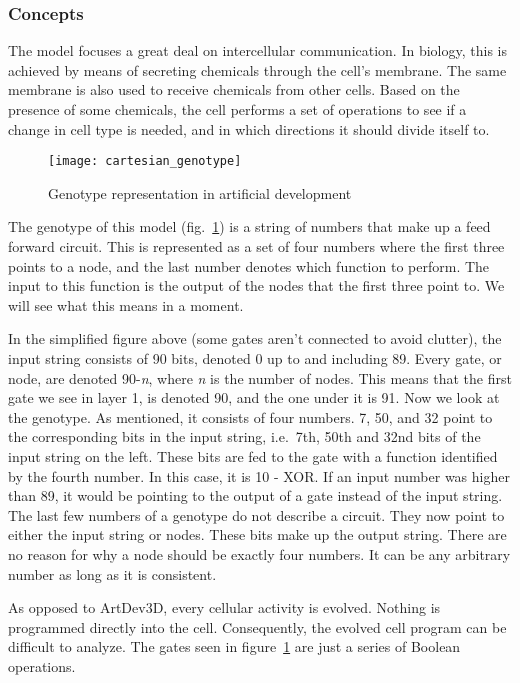 \subsubsection{Concepts}
The model focuses a great deal on intercellular communication. In biology, this is achieved by means of secreting chemicals through the cell's membrane. The same membrane is also used to receive chemicals from other cells. Based on the presence of some chemicals, the cell performs a set of operations to see if a change in cell type is needed, and in which directions it should divide itself to.

\begin{figure}[!ht]
	\centering
	\texttt{[image: cartesian\_genotype]}
	\caption{Genotype representation in artificial development}
	\label{fig:cartesian_genotype}
\end{figure}

The genotype of this model (fig.~\ref{fig:cartesian_genotype}) is a string of numbers that make up a feed forward circuit. This is represented as a set of four numbers where the first three points to a node, and the last number denotes which function to perform. The input to this function is the output of the nodes that the first three point to. We will see what this means in a moment.

In the simplified figure above (some gates aren't connected to avoid clutter), the input string consists of 90 bits, denoted 0 up to and including 89. Every gate, or node, are denoted 90-\emph{n}, where \emph{n} is the number of nodes. This means that the first gate we see in layer 1, is denoted 90, and the one under it is 91. Now we look at the genotype. As mentioned, it consists of four numbers. 7, 50, and 32 point to the corresponding bits in the input string, i.e.\ 7th, 50th and 32nd bits of the input string on the left. These bits are fed to the gate with a function identified by the fourth number. In this case, it is 10 - XOR. If an input number was higher than 89, it would be pointing to the output of a gate instead of the input string. The last few numbers of a genotype do not describe a circuit. They now point to either the input string or nodes. These bits make up the output string. There are no reason for why a node should be exactly four numbers. It can be any arbitrary number as long as it is consistent.

As opposed to ArtDev3D, every cellular activity is evolved. Nothing is programmed directly into the cell. Consequently, the evolved cell program can be difficult to analyze. The gates seen in figure~\ref{fig:cartesian_genotype} are just a series of Boolean operations.

